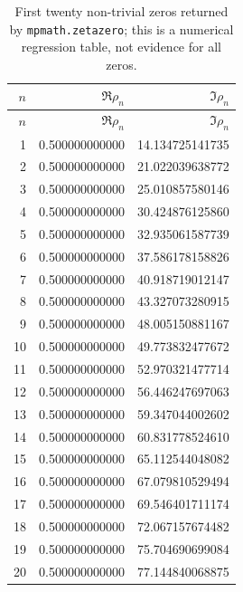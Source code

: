 \begin{longtable}{r r r}
\caption{First twenty non-trivial zeros returned by \texttt{mpmath.zetazero}; this is a numerical regression table, not evidence for all zeros.}\label{tab:first-zeros}\\
\toprule
$n$ & $\Re\rho_n$ & $\Im\rho_n$\\
\midrule
\endfirsthead
\toprule
$n$ & $\Re\rho_n$ & $\Im\rho_n$\\
\midrule
\endhead
1 & 0.500000000000 & 14.134725141735\\
2 & 0.500000000000 & 21.022039638772\\
3 & 0.500000000000 & 25.010857580146\\
4 & 0.500000000000 & 30.424876125860\\
5 & 0.500000000000 & 32.935061587739\\
6 & 0.500000000000 & 37.586178158826\\
7 & 0.500000000000 & 40.918719012147\\
8 & 0.500000000000 & 43.327073280915\\
9 & 0.500000000000 & 48.005150881167\\
10 & 0.500000000000 & 49.773832477672\\
11 & 0.500000000000 & 52.970321477714\\
12 & 0.500000000000 & 56.446247697063\\
13 & 0.500000000000 & 59.347044002602\\
14 & 0.500000000000 & 60.831778524610\\
15 & 0.500000000000 & 65.112544048082\\
16 & 0.500000000000 & 67.079810529494\\
17 & 0.500000000000 & 69.546401711174\\
18 & 0.500000000000 & 72.067157674482\\
19 & 0.500000000000 & 75.704690699084\\
20 & 0.500000000000 & 77.144840068875\\
\bottomrule
\end{longtable}
